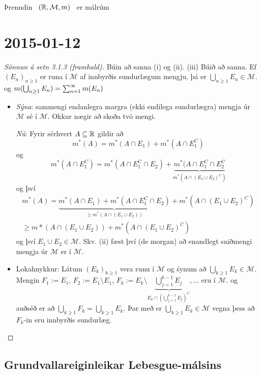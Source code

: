 \documentclass[12pt]{report}
\newcommand{\cM}{\mathcal{M}}
\newcommand{\M}{{\cal M}}
\begin{document}
Þrenndin \ $(\R,\M,m)$ \ er málrúm
\chapter{2015-01-12}

    \begin{proof}[Sönnun á setn 3.1.3 (framhald)]

      Búin að sanna (i) og (ii). (iii) Búið að sanna. Ef
      $(E_n)_{n \geq 1}$ er runa í $\cM$ af innbyrðis
      sundurlægum mengju, þá er
      $\bigcup_{n \geq 1} E_n \in \cM$.  og
      $m(\bigcup_{n \geq 1} E_n) = \sum_{n = 1}^{\infty} m (E_n)$
    
    \begin{itemize}
    \item  \emph{Sýna}: sammengi endanlegra margra (ekki
      endilega sundurlægra) mengja úr $\cM$ sé í $\cM$.  Okkur
      nægir að skoða tvö mengi.

      \emph{Nú}: Fyrir sérhvert $A \subseteq \mathbb{R}$ gildir
      að \[m^*(A) = m^*(A \cap E_1) + m^*(A \cap E_1^C)\]
      og
      \[m^*(A \cap E_1^C) = m^*(A \cap E_1^C \cap E_2) +
      \underbrace{m^*(A \cap E_1^C \cap E_2^C}_{m^*(A \cap
        (E_1 \cup E_2)^C)}\] og því
      \begin{gather*}
        m^*(A) = \underbrace{m^*(A \cap E_1) + m^*(A \cap
          E_1^C \cap
          E_2)}_{\geq m^*(A \cap (E_1 \cup E_2))} + m^*(A \cap (E_1 \cup E_2)^C)\\
        \geq m*(A \cap (E_1 \cup E_2)) + m^*(A \cap (E_1 \cup
        E_2)^C)
      \end{gather*}
      og því $E_1 \cup E_2 \in \cM$.  Skv. (ii) fæst því (de
      morgan) að enandlegt sniðmengi mengja úr $\cM$ er í
      $\cM$.

\item
       Lokahnykkur: Látum $(E_k)_{k \geq 1}$ vera runu
      í $\cM$ og śynum að $\bigcup_{k \geq 1} E_k \in
      \cM$.
      Mengin $F_1 := E_1$, $F_2 := E_1 \setminus E_1$,
      $F_k := E_k \setminus \underbrace{\bigcup_{j=1}^{k-1}
        E_j}_{E_k \cap (\bigcup_{j=1}^{k-1} E_j)^C}, \dotsc$
      eru í $\cM$.  og auðséð er að
      $\bigcup_{k \geq 1} F_k = \bigcup_{k \geq 1} E_k$. Þar
      með er $\bigcup_{k \geq 1} E_k \in \cM$ vegna þess að
      $F_k$-in eru innbyrðis sundurlæg.
      \end{itemize}
    \end{proof}

    \section{Grundvallareiginleikar Lebesgue-málsins}
    
\end{document}
